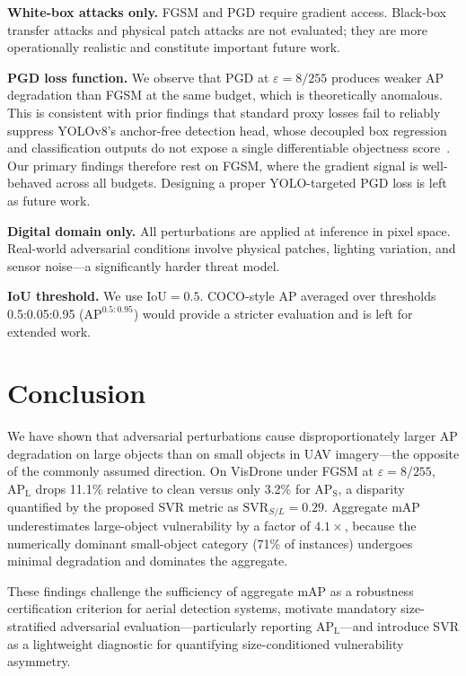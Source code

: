 \documentclass[journal]{IEEEtran}
\begin{document}
\textbf{White-box attacks only.}
FGSM and PGD require gradient access.
Black-box transfer attacks and physical patch attacks
are not evaluated; they are more operationally realistic
and constitute important future work.

\textbf{PGD loss function.}
We observe that PGD at $\varepsilon=8/255$ produces weaker
AP degradation than FGSM at the same budget, which is
theoretically anomalous.
This is consistent with prior findings that standard proxy losses
fail to reliably suppress YOLOv8's anchor-free detection head,
whose decoupled box regression and classification outputs do not
expose a single differentiable objectness score~\cite{adversarialYOLO2022}.
Our primary findings therefore rest on FGSM, where the gradient
signal is well-behaved across all budgets.
Designing a proper YOLO-targeted PGD loss is left as future work.

\textbf{Digital domain only.}
All perturbations are applied at inference in pixel space.
Real-world adversarial conditions involve physical patches,
lighting variation, and sensor noise---a significantly
harder threat model.

\textbf{IoU threshold.}
We use $\text{IoU}=0.5$. COCO-style AP averaged over
thresholds 0.5:0.05:0.95 ($\text{AP}^{0.5:0.95}$) would
provide a stricter evaluation and is left for extended work.

\section{Conclusion}
\label{sec:conclusion}

We have shown that adversarial perturbations cause
disproportionately larger AP degradation on large objects
than on small objects in UAV imagery---the opposite of the
commonly assumed direction.
On VisDrone under FGSM at $\varepsilon=8/255$,
$\text{AP}_\text{L}$ drops 11.1\% relative to clean
versus only 3.2\% for $\text{AP}_\text{S}$, a disparity
quantified by the proposed SVR metric as $\text{SVR}_{S/L}=0.29$.
Aggregate mAP underestimates large-object vulnerability by
a factor of $4.1\times$, because the numerically dominant
small-object category (71\% of instances) undergoes
minimal degradation and dominates the aggregate.

These findings challenge the sufficiency of aggregate mAP
as a robustness certification criterion for aerial detection
systems, motivate mandatory size-stratified adversarial
evaluation---particularly reporting $\text{AP}_\text{L}$---and
introduce SVR as a lightweight diagnostic for quantifying
size-conditioned vulnerability asymmetry.
\end{document}
